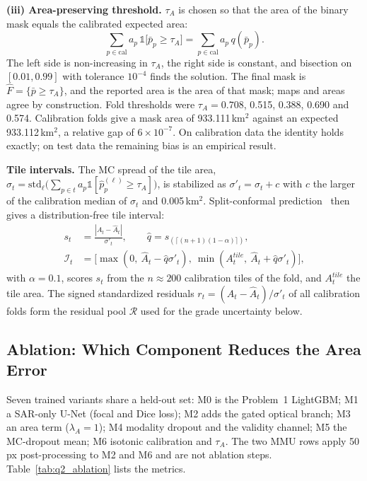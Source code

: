 \textbf{(iii) Area-preserving threshold.} $\tau_A$ is chosen so that the area of the binary mask equals the calibrated expected area:
\begin{equation}
\sum_{p\in\mathrm{cal}}a_p\,\mathbb 1\big[\bar p_p\ge\tau_A\big]=\sum_{p\in\mathrm{cal}}a_p\,q(\bar p_p).
\label{eq:tauA}
\end{equation}
The left side is non-increasing in $\tau_A$, the right side is constant, and bisection on $[0.01,0.99]$ with tolerance $10^{-4}$ finds the solution. The final mask is $\hat F=\{\bar p\ge\tau_A\}$, and the reported area is the area of that mask; maps and areas agree by construction. Fold thresholds were $\tau_A=0.708$, 0.515, 0.388, 0.690 and 0.574. Calibration folds give a mask area of 933.111\,km$^2$ against an expected 933.112\,km$^2$, a relative gap of $6\times10^{-7}$. On calibration data the identity holds exactly; on test data the remaining bias is an empirical result.

\textbf{Tile intervals.} The MC spread of the tile area, $\sigma_t=\mathrm{std}_\ell\big(\sum_{p\in t}a_p\mathbb 1[\hat p^{(\ell)}_p\ge\tau_A]\big)$, is stabilized as $\sigma'_t=\sigma_t+c$ with $c$ the larger of the calibration median of $\sigma_t$ and 0.005\,km$^2$. Split-conformal prediction~\cite{lei2018conformal} then gives a distribution-free tile interval:
\begin{equation}
\begin{split}
s_t&=\frac{|A_t-\hat A_t|}{\sigma'_t},\qquad
\hat q=s_{(\lceil(n+1)(1-\alpha)\rceil)},\\
\mathcal I_t&=\Big[\max(0,\ \hat A_t-\hat q\sigma'_t),\ \min(A^{tile}_t,\ \hat A_t+\hat q\sigma'_t)\Big],
\end{split}
\label{eq:conformal}
\end{equation}
with $\alpha=0.1$, scores $s_t$ from the $n\approx200$ calibration tiles of the fold, and $A^{tile}_t$ the tile area. The signed standardized residuals $r_t=(A_t-\hat A_t)/\sigma'_t$ of all calibration folds form the residual pool $\mathcal R$ used for the grade uncertainty below.

\subsection{Ablation: Which Component Reduces the Area Error}

Seven trained variants share a held-out set: M0 is the Problem~1 LightGBM; M1 a SAR-only U-Net (focal and Dice loss); M2 adds the gated optical branch; M3 an area term ($\lambda_A=1$); M4 modality dropout and the validity channel; M5 the MC-dropout mean; M6 isotonic calibration and $\tau_A$. The two MMU rows apply 50 px post-processing to M2 and M6 and are not ablation steps. Table~\ref{tab:q2_ablation} lists the metrics.

